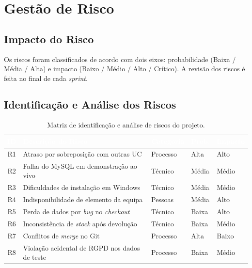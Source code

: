 \documentclass[11pt,a4paper]{report}
\begin{document}
\chapter{Gestão de Risco}\label{cap:risco}

\section{Impacto do Risco}
Os riscos foram classificados de acordo com dois eixos: probabilidade (Baixa / Média / Alta) e impacto (Baixo / Médio / Alto / Crítico). A revisão dos riscos é feita no final de cada \textit{sprint}.

\section{Identificação e Análise dos Riscos}

\begin{table}[H]
\centering\small
\begin{tabularx}{\textwidth}{c X L{2cm} L{1.6cm} L{1.6cm}}
\toprule
{}
\textbf{\textcolor{white}{ID}} &
\textbf{\textcolor{white}{Descrição do Risco}} &
\textbf{\textcolor{white}{Categoria}} &
\textbf{\textcolor{white}{Prob.}} &
\textbf{\textcolor{white}{Impacto}} \\
\midrule
R1 & Atraso por sobreposição com outras UC & Processo & Alta & Alto \\
R2 & Falha do MySQL em demonstração ao vivo & Técnico & Média & Médio \\
R3 & Dificuldades de instalação em Windows & Técnico & Média & Médio \\
R4 & Indisponibilidade de elemento da equipa & Pessoas & Média & Alto \\
R5 & Perda de dados por \textit{bug} no \textit{checkout} & Técnico & Baixa & Alto \\
R6 & Inconsistência de \textit{stock} após devolução & Técnico & Baixa & Médio \\
R7 & Conflitos de \textit{merge} no Git & Processo & Alta & Baixo \\
R8 & Violação acidental de RGPD nos dados de teste & Processo & Baixa & Médio \\
\bottomrule
\end{tabularx}
\caption{Matriz de identificação e análise de riscos do projeto.}
\label{tab:riscos}
\end{table}
\end{document}
